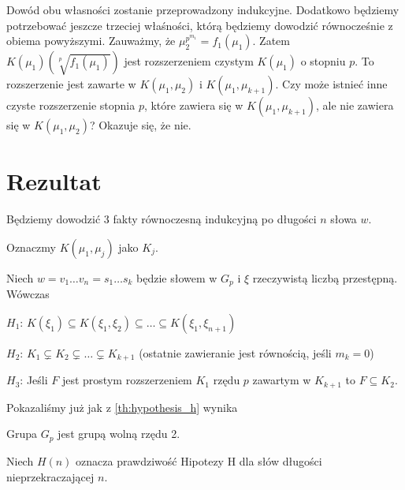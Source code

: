 Dowód obu własności zostanie przeprowadzony indukcyjne. Dodatkowo będziemy
potrzebować jeszcze trzeciej właśności, którą będziemy dowodzić równocześnie z
obiema powyższymi. Zauważmy, że $\mu_2^{p^{m_1}} = f_1\left(\mu_1\right)$.
Zatem $K\left(\mu_1\right)\left(\sqrt[p]{f_1\left(\mu_1\right)}\right)$ jest
rozszerzeniem czystym $K\left(\mu_1\right)$ o stopniu $p$.
To rozszerzenie jest zawarte w $K\left(\mu_1, \mu_2\right)$ i
$K\left(\mu_1, \mu_{k+1}\right)$.
Czy może istnieć inne czyste rozszerzenie stopnia $p$, które zawiera się w
$K\left(\mu_1, \mu_{k+1}\right)$, ale nie zawiera się w $K\left(\mu_1,
\mu_2\right)$? Okazuje się, że nie.

\section{Rezultat}

Będziemy dowodzić 3 fakty równoczesną indukcyjną po długości $n$ słowa $w$.

Oznaczmy $K\left(\mu_1, \mu_j\right)$ jako $K_j$.

\begin{theorem}
  Niech $w = v_1 \ldots v_n = s_1 \ldots s_k$ będzie słowem w $G_p$ i $\xi$
  rzeczywistą liczbą przestępną. Wówczas

  \begin{description}
    \item{$H_1$:}
      $K\left(\xi_1\right)\subseteq
      K\left(\xi_1, \xi_2\right)\subseteq
      \ldots \subseteq
      K\left(\xi_1, \xi_{n+1}\right)$
    \item{$H_2$:}
      $K_1 \subsetneq K_2 \subsetneq \ldots \subsetneq K_{k+1}$ (ostatnie zawieranie jest
      równością, jeśli $m_k = 0$)
    \item{$H_3$:}
      Jeśli $F$ jest prostym rozszerzeniem $K_1$ rzędu $p$  zawartym w $K_{k+1}$
      to $F \subseteq K_2$.
  \end{description}
  \label{th:hypothesis_h}
\end{theorem}

Pokazaliśmy już jak z \ref{th:hypothesis_h} wynika

\begin{corollary}
  Grupa $G_p$ jest grupą wolną rzędu 2.
\end{corollary}

Niech $H(n)$ oznacza prawdziwość Hipotezy H dla słów długości nieprzekraczającej
$n$.

